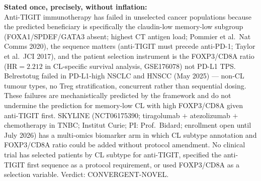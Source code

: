 \documentclass[12pt, a4paper]{article}
\begin{document}
\begin{center}
\colorbox{findingbox}{
\begin{minipage}{0.88\textwidth}
\vspace{0.6em}
\textbf{Stated once, precisely, without inflation:}
\\[0.5em]
Anti-TIGIT immunotherapy has failed in unselected
cancer populations because the predicted beneficiary
is specifically the claudin-low memory-low subgroup
(FOXA1/SPDEF/GATA3 absent; highest CT antigen load;
Pommier et al.\ Nat Comms 2020), the sequence
matters (anti-TIGIT must precede anti-PD-1; Taylor
et al.\ JCI 2017), and the patient selection
instrument is the FOXP3/CD8A ratio (HR$=2.212$ in
CL-specific survival analysis, GSE176078) not PD-L1
TPS. Belrestotug failed in PD-L1-high NSCLC and
HNSCC (May 2025) --- non-CL tumour types, no Treg
stratification, concurrent rather than sequential
dosing. These failures are mechanistically predicted
by the framework and do not undermine the prediction
for memory-low CL with high FOXP3/CD8A given
anti-TIGIT first. SKYLINE (NCT06175390; tiragolumab
$+$ atezolizumab $+$ chemotherapy in TNBC; Institut
Curie; PI: Prof.\ Bidard; enrollment open until
July 2026) has a multi-omics biomarker arm in which
CL subtype annotation and FOXP3/CD8A ratio could be
added without protocol amendment. No clinical trial
has selected patients by CL subtype for anti-TIGIT,
specified the anti-TIGIT first sequence as a protocol
requirement, or used FOXP3/CD8A as a selection
variable. Verdict: CONVERGENT-NOVEL.
\vspace{0.5em}
\end{minipage}}
\end{center}
\end{document}
